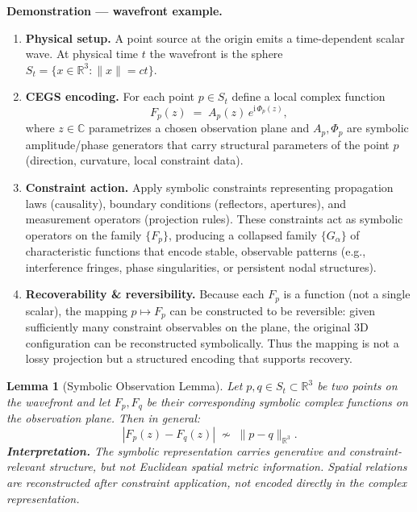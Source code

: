 \documentclass[11pt]{article}
\theoremstyle{plain}
\newtheorem{lemma}{Lemma}[section]
\theoremstyle{definition}
\theoremstyle{remark}
\begin{document}
\vspace{8pt}



\noindent\textbf{Demonstration — wavefront example.}

\begin{enumerate}[leftmargin=*,itemsep=6pt]
\item\textbf{Physical setup.} A point source at the origin emits a time-dependent scalar wave. At physical time \(t\) the wavefront is the sphere \(S_t=\{x\in\mathbb{R}^3: \|x\|=c t\}\).
\item \textbf{CEGS encoding.} For each point \(p\in S_t\) define a local complex function
  \[
    F_p(z) \;=\; A_p(z)\, e^{\mathrm{i}\,\Phi_p(z)},
  \]
  where \(z\in\mathbb{C}\) parametrizes a chosen observation plane and \(A_p,\Phi_p\) are symbolic amplitude/phase generators that carry structural parameters of the point \(p\) (direction, curvature, local constraint data).
  \item \textbf{Constraint action.} Apply symbolic constraints representing propagation laws (causality), boundary conditions (reflectors, apertures), and measurement operators (projection rules). These constraints act as symbolic operators on the family \(\{F_p\}\), producing a collapsed family \(\{G_\alpha\}\) of characteristic functions that encode stable, observable patterns (e.g., interference fringes, phase singularities, or persistent nodal structures).
  \item \textbf{Recoverability \& reversibility.} Because each \(F_p\) is a function (not a single scalar), the mapping \(p\mapsto F_p\) can be constructed to be reversible: given sufficiently many constraint observables on the plane, the original 3D configuration can be reconstructed symbolically. Thus the mapping is not a lossy projection but a structured encoding that supports recovery.
\end{enumerate}

\vspace{8pt}
\begin{lemma}[Symbolic Observation Lemma]
Let $p,q \in S_t \subset \mathbb{R}^3$ be two points on the wavefront and let
$F_p, F_q$ be their corresponding symbolic complex functions on the observation
plane. Then in general:
\[
|F_p(z) - F_q(z)| \;\not\sim\; \|p - q\|_{\mathbb{R}^3}.
\]
\textbf{Interpretation.} The symbolic representation carries generative and
constraint-relevant structure, but not Euclidean spatial metric information. Spatial
relations are reconstructed \emph{after} constraint application, not encoded directly
in the complex representation.
\end{lemma}
\end{document}
